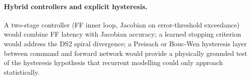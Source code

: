 \paragraph{Hybrid controllers and explicit hysteresis.}
\label{sec:fw_hybrids}
A two-stage controller (FF inner loop, Jacobian on error-threshold exceedance) would combine FF latency with Jacobian accuracy; a learned stopping criterion would address the DS2 spiral divergence; a Preisach or Bouc-Wen hysteresis layer between command and forward network would provide a physically grounded test of the hysteresis hypothesis that recurrent modelling could only approach statistically.
